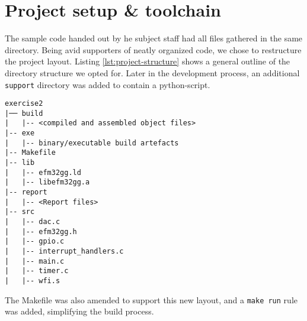 \section{Project setup \& toolchain}

The sample code handed out by he subject staff had all files gathered in the same directory. Being avid supporters of neatly organized code, we chose to restructure the project layout. Listing \ref{lst:project-structure} shows a general outline of the directory structure we opted for. Later in the development process, an additional \texttt{support} directory was added to contain a python-script.

\begin{lstlisting}[label=lst:project-structure, caption=Revised project structure]
exercise2
|── build
|   |-- <compiled and assembled object files>
|-- exe
|   |-- binary/executable build artefacts
|-- Makefile
|-- lib
|   |-- efm32gg.ld
|   |-- libefm32gg.a
|-- report
|   |-- <Report files>
|-- src
|   |-- dac.c
|   |-- efm32gg.h
|   |-- gpio.c
|   |-- interrupt_handlers.c
|   |-- main.c
|   |-- timer.c
|   |-- wfi.s
\end{lstlisting}

The Makefile was also amended to support this new layout, and a \texttt{make run} rule was added, simplifying the build process.

